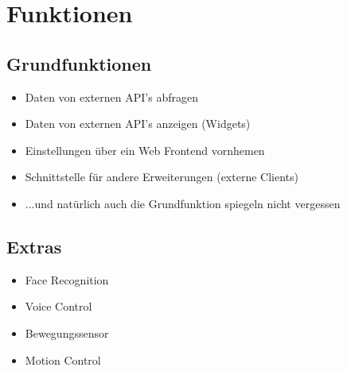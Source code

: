 
\section{Funktionen}\label{Funktionen}
\subsection{Grundfunktionen}
\begin{itemize}
\item Daten von externen API's abfragen
\item Daten von externen API's anzeigen (Widgets)
\item Einstellungen über ein Web Frontend vornhemen
\item Schnittstelle für andere Erweiterungen (externe Clients)
\item ...und natürlich auch die Grundfunktion spiegeln nicht vergessen
\end{itemize}

%
\subsection{Extras}
\begin{itemize}
\item Face Recognition
\item Voice Control
\item Bewegungssensor
\item Motion Control
\end{itemize}

